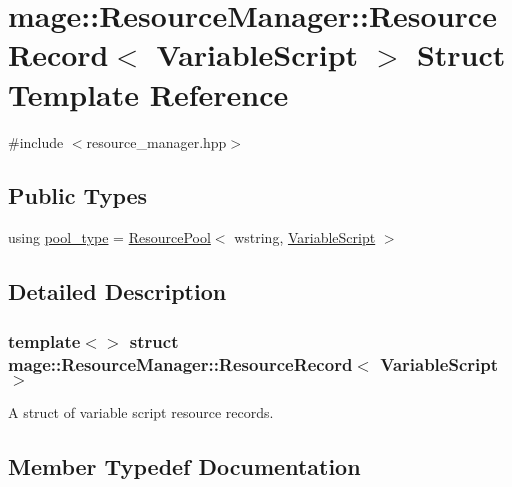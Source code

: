 \hypertarget{structmage_1_1_resource_manager_1_1_resource_record_3_01_variable_script_01_4}{}\section{mage\+:\+:Resource\+Manager\+:\+:Resource\+Record$<$ Variable\+Script $>$ Struct Template Reference}
\label{structmage_1_1_resource_manager_1_1_resource_record_3_01_variable_script_01_4}


{\ttfamily \#include $<$resource\+\_\+manager.\+hpp$>$}

\subsection*{Public Types}
\begin{DoxyCompactItemize}
\item 
using \hyperlink{structmage_1_1_resource_manager_1_1_resource_record_3_01_variable_script_01_4_a656ca7aee7665df5691f0950bac6fbad}{pool\+\_\+type} = \hyperlink{classmage_1_1_resource_pool}{Resource\+Pool}$<$ wstring, \hyperlink{classmage_1_1_variable_script}{Variable\+Script} $>$
\end{DoxyCompactItemize}


\subsection{Detailed Description}
\subsubsection*{template$<$$>$\newline
struct mage\+::\+Resource\+Manager\+::\+Resource\+Record$<$ Variable\+Script $>$}

A struct of variable script resource records. 

\subsection{Member Typedef Documentation}
\hypertarget{structmage_1_1_resource_manager_1_1_resource_record_3_01_variable_script_01_4_a656ca7aee7665df5691f0950bac6fbad}{}\label{structmage_1_1_resource_manager_1_1_resource_record_3_01_variable_script_01_4_a656ca7aee7665df5691f0950bac6fbad} 
